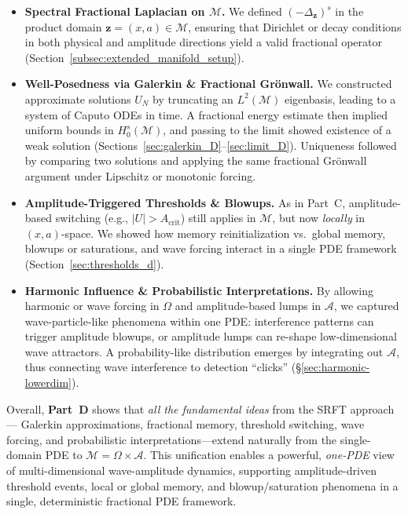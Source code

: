 \documentclass[12pt]{article}
\begin{document}
\begin{itemize}
    \item \textbf{Spectral Fractional Laplacian on \(\mathcal{M}\).} We defined $(-\Delta_{\mathbf{z}})^s$ in the product domain 
          \(\mathbf{z}=(x,a)\in\mathcal{M}\), ensuring that Dirichlet or decay conditions 
          in both physical and amplitude directions yield a valid fractional operator 
          (Section~\ref{subsec:extended_manifold_setup}).
    \item \textbf{Well-Posedness via Galerkin \& Fractional Gr\"onwall.} We constructed 
          approximate solutions $U_N$ by truncating an $L^2(\mathcal{M})$ eigenbasis, 
          leading to a system of Caputo ODEs in time. A fractional energy estimate then 
          implied uniform bounds in $H_0^s(\mathcal{M})$, and passing to the limit showed 
          existence of a weak solution 
          (Sections~\ref{sec:galerkin_D}--\ref{sec:limit_D}). Uniqueness followed by 
          comparing two solutions and applying the same fractional Gr\"onwall argument 
          under Lipschitz or monotonic forcing.
    \item \textbf{Amplitude-Triggered Thresholds \& Blowups.} As in Part~C, amplitude-based 
          switching (e.g., $\lvert U\rvert>A_{\mathrm{crit}}$) still applies in 
          \(\mathcal{M}\), but now \emph{locally} in $(x,a)$-space. We showed how memory 
          reinitialization vs.\ global memory, blowups or saturations, and wave forcing 
          interact in a single PDE framework (Section~\ref{sec:thresholds_d}).
    \item \textbf{Harmonic Influence \& Probabilistic Interpretations.} By allowing harmonic 
          or wave forcing in $\Omega$ and amplitude-based lumps in $\mathcal{A}$, we 
          captured wave-particle-like phenomena within one PDE: interference patterns can 
          trigger amplitude blowups, or amplitude lumps can re-shape low-dimensional wave 
          attractors. A probability-like distribution emerges by integrating out $\mathcal{A}$, 
          thus connecting wave interference to detection “clicks” (\S\ref{sec:harmonic-lowerdim}).
\end{itemize}

Overall, \textbf{Part~D} shows that \emph{all the fundamental ideas} from the SRFT approach---%
Galerkin approximations, fractional memory, threshold switching, wave forcing, and 
probabilistic interpretations---extend naturally from the single-domain PDE to 
\(\mathcal{M}\!=\!\Omega\times\mathcal{A}\). This unification enables a powerful, 
\emph{one-PDE} view of multi-dimensional wave-amplitude dynamics, supporting amplitude-driven 
threshold events, local or global memory, and blowup/saturation phenomena in a single, 
deterministic fractional PDE framework.
\end{document}
